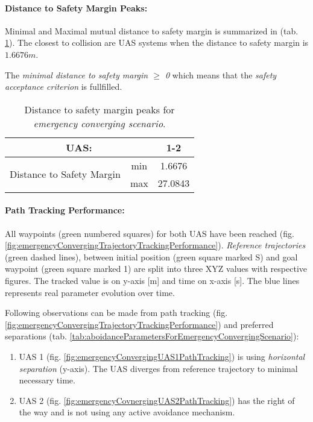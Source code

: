 \paragraph{Distance to Safety Margin Peaks:} Minimal and Maximal mutual distance to safety margin is summarized in (tab. \ref{tab:testCaseEmergencyConvergingSafetyMarginDistances}). The closest to collision are UAS systems when the distance to safety margin is $1.6676m$.

The \emph{minimal distance to safety margin  $\ge$ 0} which means that the \emph{safety acceptance criterion} is fullfilled. 

\begin{table}[H]
    \centering
    \begin{tabular}{c|c||c}
    \multicolumn{2}{c||}{UAS:} & 1-2 \\\hline\hline
    \multirow{2}{*}{Distance to Safety Margin} & min & 1.6676 \\\cline{2-3}
                                            & max & 27.0843 \\
    \end{tabular}
    \caption{Distance to safety margin peaks for \emph{emergency converging scenario}.}
    \label{tab:testCaseEmergencyConvergingSafetyMarginDistances}
\end{table}

\newpage
\paragraph{Path Tracking Performance:} All waypoints (green numbered squares) for both  UAS have been reached (fig. \ref{fig:emergencyConvergingTrajectoryTrackingPerformance}). \emph{Reference trajectories} (green dashed lines), between initial position (green square marked S) and goal waypoint (green square marked 1) are split into three XYZ values with respective figures. The tracked value is on y-axis [m] and time on x-axis [s]. The blue lines represents real parameter evolution over time.

Following observations can be made from path tracking (fig. \ref{fig:emergencyConvergingTrajectoryTrackingPerformance}) and preferred separations (tab. \ref{tab:aboidanceParametersForEmergencyConvergingScenario}):

\begin{enumerate}
    \item UAS 1 (fig. \ref{fig:emergencyConvergingUAS1PathTracking}) is using \emph{horizontal separation} (y-axis). The UAS diverges from reference trajectory to minimal necessary time.
    \item UAS 2 (fig. \ref{fig:emergencyCovnergingUAS2PathTracking}) has the right of the way and is not using any active avoidance mechanism. 
\end{enumerate}

